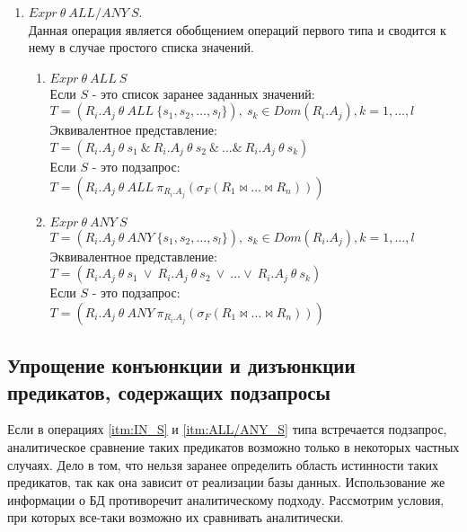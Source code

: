\documentclass{cmi}
\def \n #1{\mathit{#1}}
\begin{document}
\begin{enumerate}
	
	\item \label{itm:ALL/ANY_S} $\n{Expr}\ \theta\ \n{ALL/ANY}\ S$.\\
	Данная операция является обобщением операций первого типа и сводится к нему в случае простого списка
	значений.
	\begin{enumerate}
		\item $\n{Expr}\ \theta\ \n{ALL}\ S$\\ Если $S$ - это список заранее заданных значений:\\
		$T = (\n{R_i.A_j}\ \theta\ \n{ALL}\ \{s_1, s_2, \dots, s_l \}),\ s_k \in Dom(R_i.A_j), k = 1,
		\dots, l$\\  
		Эквивалентное представление:\\
		$T = (\n{R_i.A_j}\ \theta\ s_1\ \&\ \n{R_i.A_j}\ \theta\ s_2\ \&\ \dots \&\ \n{R_i.A_j}\ \theta\
		s_k)$\\
		Если $S$ - это подзапрос:\\
		$T = (\n{R_i.A_j}\ \theta\ \n{ALL}\ \pi_{R_i.A_j} (\sigma_F (R_1 \Join \dots \Join R_n)))$\\
		\item $\n{Expr}\ \theta\ \n{ANY}\ S$\\
		$T = (\n{R_i.A_j}\ \theta\ \n{ANY}\ \{s_1, s_2, \dots, s_l \}),\ s_k \in Dom(R_i.A_j), k = 1,
		\dots, l$\\  
		Эквивалентное представление:\\
		$T = (\n{R_i.A_j}\ \theta\ s_1\ \vee\ \n{R_i.A_j}\ \theta\ s_2\ \vee\ \dots \vee\ \n{R_i.A_j}\
		\theta\ s_k)$\\
		Если $S$ - это подзапрос:\\
		$T = (\n{R_i.A_j}\ \theta\ \n{ANY}\ \pi_{R_i.A_j} (\sigma_F (R_1 \Join \dots \Join R_n)))$\\
	\end{enumerate}
\end{enumerate}

\subsection{Упрощение конъюнкции и дизъюнкции предикатов, содержащих подзапросы}
Если в операциях \ref{itm:IN_S} и \ref{itm:ALL/ANY_S} типа встречается подзапрос,
аналитическое сравнение таких предикатов возможно только в некоторых частных случаях. Дело в том,
что нельзя заранее определить область истинности таких предикатов, так как она зависит от реализации
базы данных. Использование же информации о БД противоречит аналитическому подходу. Рассмотрим
условия, при которых все-таки возможно их сравнивать аналитически.
\end{document}
